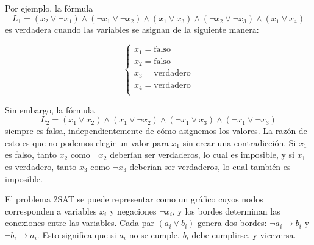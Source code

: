 Por ejemplo, la fórmula
\[
L_1 = (x_2 \lor \lnot x_1) \land
      (\lnot x_1 \lor \lnot x_2) \land
      (x_1 \lor x_3) \land
      (\lnot x_2 \lor \lnot x_3) \land
      (x_1 \lor x_4)
\]
es verdadera cuando las variables se asignan de la siguiente manera:

\[
\begin{cases}
x_1 = \textrm{falso} \\
x_2 = \textrm{falso} \\
x_3 = \textrm{verdadero} \\
x_4 = \textrm{verdadero} \\
\end{cases}
\]

Sin embargo, la fórmula
\[
L_2 = (x_1 \lor x_2) \land
      (x_1 \lor \lnot x_2) \land
      (\lnot x_1 \lor x_3) \land
      (\lnot x_1 \lor \lnot x_3)
\]
siempre es falsa, independientemente de cómo
asignemos los valores.
La razón de esto es que no podemos
elegir un valor para $x_1$
sin crear una contradicción.
Si $x_1$ es falso, tanto $x_2$ como $\lnot x_2$
deberían ser verdaderos, lo cual es imposible,
y si $x_1$ es verdadero, tanto $x_3$ como $\lnot x_3$
deberían ser verdaderos, lo cual también es imposible.

El problema 2SAT se puede representar como un gráfico
cuyos nodos corresponden a
variables $x_i$ y negaciones $\lnot x_i$,
y los bordes determinan las conexiones
entre las variables.
Cada par $(a_i \lor b_i)$ genera dos bordes:
$\lnot a_i \to b_i$ y $\lnot b_i \to a_i$.
Esto significa que si $a_i$ no se cumple,
$b_i$ debe cumplirse, y viceversa.

